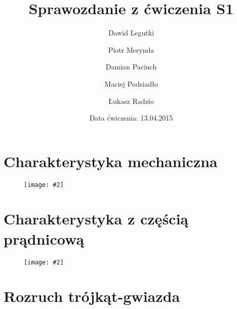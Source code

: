 \documentclass[12pt]{article}
\title{Sprawozdanie z ćwiczenia S1}
\author{ 
Dawid Legutki \and Piotr Merynda \and Damian Paciuch \and Maciej Podsiadło \and Łukasz Radzio}
\date{Data ćwiczenia: 13.04.2015}
\newcommand{\obrazek}[2]
{
	\begin{figure}[H]
	\centering
	\texttt{[image: \#2]}
	\end{figure}
}
\begin{document}
\maketitle

\section{Charakterystyka mechaniczna}

\obrazek{12}{Wykresy/Mechaniczna}


\section{Charakterystyka z częścią prądnicową}
\obrazek{12}{Wykresy/Kloss}



\section{Rozruch trójkąt-gwiazda}
\end{document}
